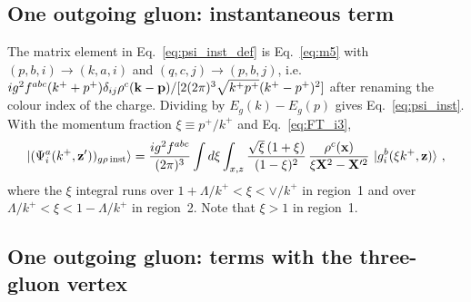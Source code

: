 \subsection{One outgoing gluon: instantaneous term}

The matrix element in Eq.~\eqref{eq:psi_inst_def} is Eq.~\eqref{eq:m5} with $(p,b,i)\to(k,a,i)$ and $(q,c,j)\to(p,b,j)$, i.e.\ $ig^2f^{abc}(k^++p^+)\delta_{ij}\rho^c(\mathbf{k}-\mathbf{p})/[2(2\pi)^3\sqrt{k^+p^+}(k^+-p^+)^2]$ after renaming the colour index of the charge. Dividing by $E_g(k)-E_g(p)$ gives Eq.~\eqref{eq:psi_inst}. With the momentum fraction $\xi\equiv p^+/k^+$ and Eq.~\eqref{eq:FT_i3},
\begin{align}\label{eq:psi_instX}
\ket{(\Psi^a_i(k^+,\mathbf{z}'))_{g\rho\,{\rm inst}}}=\frac{ig^2f^{abc}}{(2\pi)^3}\int d\xi\int_{x,z}\frac{\sqrt\xi\,(1+\xi)}{(1-\xi)^2}\,\frac{\rho^c(\mathbf{x})}{\xi\mathbf{X}^2-\mathbf{X}'^2}\,\ket{g^b_i(\xi k^+,\mathbf{z})}\,,
\end{align}
where the $\xi$ integral runs over $1+\Lambda/k^+<\xi<\vee/k^+$ in region~1 and over $\Lambda/k^+<\xi<1-\Lambda/k^+$ in region~2. Note that $\xi>1$ in region~1.


\subsection{One outgoing gluon: terms with the three-gluon vertex}

